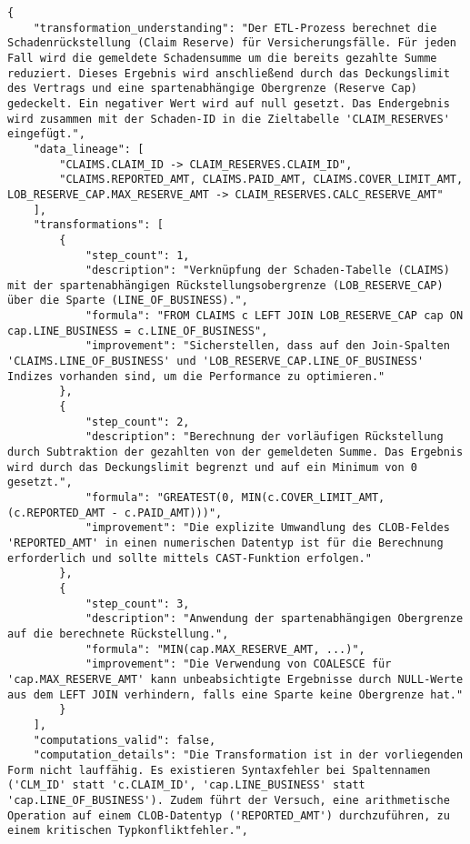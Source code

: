 \begin{lstlisting}[caption={Ausgabe: GEMINI 2.5 Pro Anwendungsfall 10 Robustheitsdurchlauf},label={gemini_case10_prompt3}]
{
    "transformation_understanding": "Der ETL-Prozess berechnet die Schadenrückstellung (Claim Reserve) für Versicherungsfälle. Für jeden Fall wird die gemeldete Schadensumme um die bereits gezahlte Summe reduziert. Dieses Ergebnis wird anschließend durch das Deckungslimit des Vertrags und eine spartenabhängige Obergrenze (Reserve Cap) gedeckelt. Ein negativer Wert wird auf null gesetzt. Das Endergebnis wird zusammen mit der Schaden-ID in die Zieltabelle 'CLAIM_RESERVES' eingefügt.",
    "data_lineage": [
        "CLAIMS.CLAIM_ID -> CLAIM_RESERVES.CLAIM_ID",
        "CLAIMS.REPORTED_AMT, CLAIMS.PAID_AMT, CLAIMS.COVER_LIMIT_AMT, LOB_RESERVE_CAP.MAX_RESERVE_AMT -> CLAIM_RESERVES.CALC_RESERVE_AMT"
    ],
    "transformations": [
        {
            "step_count": 1,
            "description": "Verknüpfung der Schaden-Tabelle (CLAIMS) mit der spartenabhängigen Rückstellungsobergrenze (LOB_RESERVE_CAP) über die Sparte (LINE_OF_BUSINESS).",
            "formula": "FROM CLAIMS c LEFT JOIN LOB_RESERVE_CAP cap ON cap.LINE_BUSINESS = c.LINE_OF_BUSINESS",
            "improvement": "Sicherstellen, dass auf den Join-Spalten 'CLAIMS.LINE_OF_BUSINESS' und 'LOB_RESERVE_CAP.LINE_OF_BUSINESS' Indizes vorhanden sind, um die Performance zu optimieren."
        },
        {
            "step_count": 2,
            "description": "Berechnung der vorläufigen Rückstellung durch Subtraktion der gezahlten von der gemeldeten Summe. Das Ergebnis wird durch das Deckungslimit begrenzt und auf ein Minimum von 0 gesetzt.",
            "formula": "GREATEST(0, MIN(c.COVER_LIMIT_AMT, (c.REPORTED_AMT - c.PAID_AMT)))",
            "improvement": "Die explizite Umwandlung des CLOB-Feldes 'REPORTED_AMT' in einen numerischen Datentyp ist für die Berechnung erforderlich und sollte mittels CAST-Funktion erfolgen."
        },
        {
            "step_count": 3,
            "description": "Anwendung der spartenabhängigen Obergrenze auf die berechnete Rückstellung.",
            "formula": "MIN(cap.MAX_RESERVE_AMT, ...)",
            "improvement": "Die Verwendung von COALESCE für 'cap.MAX_RESERVE_AMT' kann unbeabsichtigte Ergebnisse durch NULL-Werte aus dem LEFT JOIN verhindern, falls eine Sparte keine Obergrenze hat."
        }
    ],
    "computations_valid": false,
    "computation_details": "Die Transformation ist in der vorliegenden Form nicht lauffähig. Es existieren Syntaxfehler bei Spaltennamen ('CLM_ID' statt 'c.CLAIM_ID', 'cap.LINE_BUSINESS' statt 'cap.LINE_OF_BUSINESS'). Zudem führt der Versuch, eine arithmetische Operation auf einem CLOB-Datentyp ('REPORTED_AMT') durchzuführen, zu einem kritischen Typkonfliktfehler.",

\end{lstlisting}

